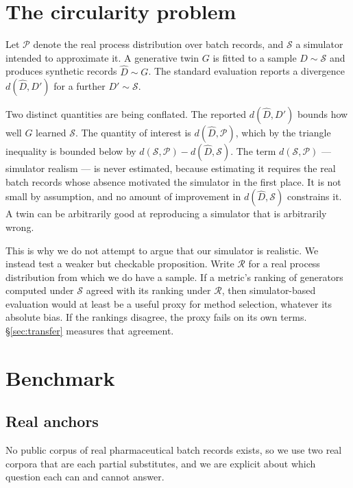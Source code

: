 \documentclass[11pt]{article}
\begin{document}
\section{The circularity problem}
\label{sec:circular}

Let $\mathcal{P}$ denote the real process distribution over batch records, and
$\mathcal{S}$ a simulator intended to approximate it. A generative twin $G$ is
fitted to a sample $D \sim \mathcal{S}$ and produces synthetic records
$\hat{D} \sim G$. The standard evaluation reports a divergence
$d(\hat{D}, D')$ for a further $D' \sim \mathcal{S}$.

Two distinct quantities are being conflated. The reported $d(\hat{D}, D')$ bounds
how well $G$ learned $\mathcal{S}$. The quantity of interest is
$d(\hat{D}, \mathcal{P})$, which by the triangle inequality is bounded below by
$d(\mathcal{S}, \mathcal{P}) - d(\hat{D}, \mathcal{S})$. The term
$d(\mathcal{S},\mathcal{P})$ --- simulator realism --- is never estimated,
because estimating it requires the real batch records whose absence motivated the
simulator in the first place. It is not small by assumption, and no amount of
improvement in $d(\hat{D},\mathcal{S})$ constrains it. A twin can be arbitrarily
good at reproducing a simulator that is arbitrarily wrong.

This is why we do not attempt to argue that our simulator is realistic. We
instead test a weaker but checkable proposition. Write $\mathcal{R}$ for a real
process distribution from which we do have a sample. If a metric's ranking of
generators computed under $\mathcal{S}$ agreed with its ranking under
$\mathcal{R}$, then simulator-based evaluation would at least be a useful proxy
for method selection, whatever its absolute bias. If the rankings disagree, the
proxy fails on its own terms. \S\ref{sec:transfer} measures that agreement.

\section{Benchmark}
\label{sec:bench}

\subsection{Real anchors}
\label{sec:anchors}

No public corpus of real pharmaceutical batch records exists, so we use two real
corpora that are each partial substitutes, and we are explicit about which
question each can and cannot answer.
\end{document}
